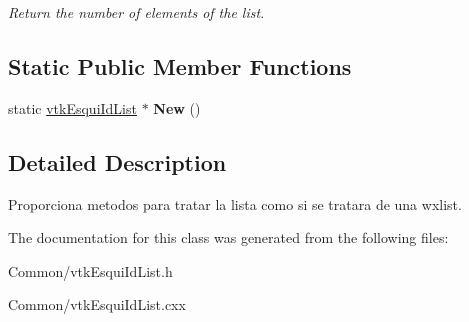 \begin{DoxyCompactItemize}
\begin{DoxyCompactList}\small\item\em Return the number of elements of the list. \item\end{DoxyCompactList}\end{DoxyCompactItemize}
\subsection*{Static Public Member Functions}
\begin{DoxyCompactItemize}
\item 
\hypertarget{classvtkEsquiIdList_addcb667a1ae1912708c0a6778e3413c8}{
static \hyperlink{classvtkEsquiIdList}{vtkEsquiIdList} $\ast$ {\bfseries New} ()}
\label{classvtkEsquiIdList_addcb667a1ae1912708c0a6778e3413c8}

\end{DoxyCompactItemize}


\subsection{Detailed Description}
Proporciona metodos para tratar la lista como si se tratara de una wxlist. 

The documentation for this class was generated from the following files:\begin{DoxyCompactItemize}
\item 
Common/vtkEsquiIdList.h\item 
Common/vtkEsquiIdList.cxx\end{DoxyCompactItemize}
